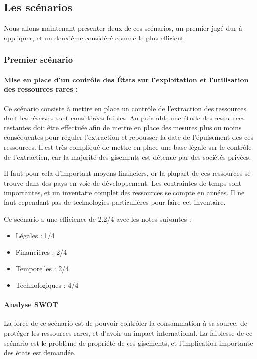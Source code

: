 \subsection{Les scénarios}

\smallbreak Nous allons maintenant présenter deux de ces scénarios, un premier jugé dur à appliquer, et un deuxième considéré comme le plus efficient.

\subsubsection{Premier scénario}    

\paragraph{Mise en place d’un contrôle des États sur l’exploitation et l’utilisation des ressources rares :}
\medbreak
Ce scénario consiste à mettre en place un contrôle de l’extraction des ressources dont les réserves sont considérées faibles. Au préalable une étude des ressources restantes doit être effectuée afin de mettre en place des mesures plus ou moins conséquentes pour réguler l’extraction et repousser la date de l’épuisement des ces ressources.
Il est très compliqué de mettre en place une base légale sur le contrôle de l’extraction, car la majorité des gisements est détenue par des sociétés privées. 

Il faut pour cela d’important moyens financiers, or la plupart de ces ressources se trouve dans des pays en voie de développement.
Les contraintes de temps sont importantes, et un inventaire complet des ressources se compte en années. 
Il ne faut cependant pas de technologies particulières pour faire cet inventaire.

Ce scénario a une efficience de 2.2/4 avec les notes suivantes :
\begin{itemize}
\item Légales : 1/4
\item Financières : 2/4
\item Temporelles : 2/4
\item Technologiques : 4/4
\end{itemize}


\paragraph{Analyse SWOT}

La force de ce scénario est de pouvoir contrôler la consommation à sa source, de protéger les ressources rares, et d’avoir un impact international.
La faiblesse de ce scénario est le problème de propriété de ces gisements, et l’implication importante des états est demandée. 


